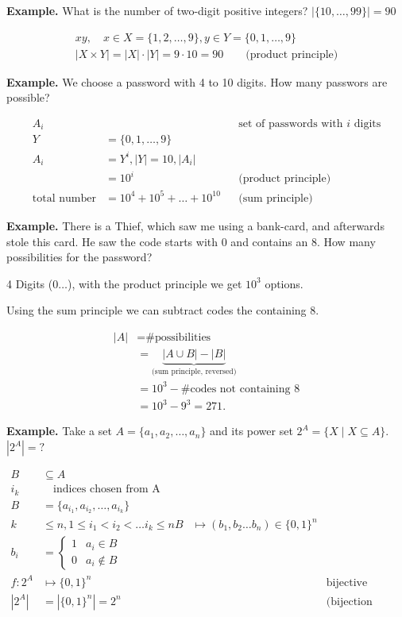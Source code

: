 \textbf{Example.}
What is the number of two-digit positive integers?
$|\{10,\ldots,99\}| = 90$

\begin{gather*}
  xy, \quad x\in X=\{1,2,\ldots ,9\}, y\in Y = \{0,1,\ldots ,9\} \\
  |X\times Y| = |X| \cdot |Y| = 9\cdot 10 = 90
    \qquad\text{(product principle)}
\end{gather*}

\textbf{Example.}
We choose a password with 4 to 10 digits. How many passwors are possible?

\begin{align*}
  A_i &&& \text{set of passwords with $i$ digits} \\
  Y &= \{0,1,\ldots ,9\} \\
  A_i &= Y^i, |Y| = 10, |A_i| \\
    &= {10}^i  && \text{(product principle)} \\
  \text{total number} &= 10^4 + 10^5 + \ldots + 10^{10} && \text{(sum principle)}
\end{align*}

\textbf{Example.}
There is a Thief, which saw me using a bank-card, and afterwards stole this card. He saw the code starts with $0$ and contains an $8$. How many possibilities for the password?

4 Digits ($0 \ldots$), with the product principle we get $10^3$ options. 

Using the sum principle we can subtract codes the containing $8$.

\begin{align*}
|A| &= \text{\# possibilities} \\
    &= \underbrace{|A\cup B| - |B|}_{\text{(sum principle, reversed)}} \\
    &= {10}^3 - \text{\# codes not containing 8} \\
    &= {10}^3 - 9^3 = 271.
\end{align*}

\textbf{Example.}
Take a set $A = \{a_1, a_2, \ldots , a_n\}$ and its power set $2^A = \{X \mid X
\subseteq A\}$. $|2^A| = ?$

\begin{align*}
  B &\subseteq A \\
  i_k &\quad\text{indices chosen from A} \\
  B &=\{a_{i_1}, a_{i_2},\ldots, a_{i_k}\} \\
  k &\leq n, 1 \leq i_1 < i_2 < \ldots i_k \leq n
    B &\mapsto
    (b_1, b_2 \ldots  b_n) \in \{0,1\}^n \\
  b_i &=
  \begin{cases}
    1 & a_i\in B \\
    0 & a_i\not\in B
  \end{cases} \\
  f: 2^A &\mapsto \{0,1\}^n &&\text{bijective mapping} \\
  |2^A| &= |\{0, 1\}^n| = 2^n
    &&\text{(bijection principle)} \\
\end{align*}

